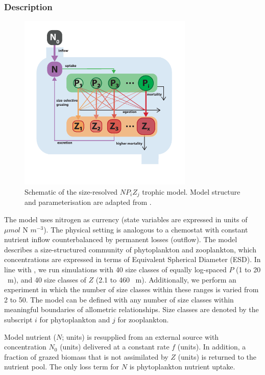 \documentclass[journal abbreviation, manuscript]{copernicus}
\begin{document}
\subsubsection{Description}
\begin{figure}[t]
\includegraphics[width=8.3cm]{Figures/firstdraft_schematics/03_schematics_ASTroCAT.pdf}
\caption{Schematic of the size-resolved $NP_{i}Z_{j}$ trophic model. Model structure and parameterisation are adapted from \citet{Banas2011b}. }
\label{Figure:ModelSchematics_3}
\end{figure}

The model uses nitrogen as currency (state variables are expressed in units of $\mu mol$ N $m^{-3}$). The physical setting is analogous to a chemostat with constant nutrient inflow counterbalanced by permanent losses (outflow). The model describes a size-structured community of phytoplankton and zooplankton, which concentrations are expressed in terms of Equivalent Spherical Diameter (ESD). In line with \citet{Banas2011b}, we run simulations with 40 size classes of equally log-spaced $P$ (1 to 20 \unit{\mu m}), and 40 size classes of $Z$ (2.1 to 460  \unit{\mu m}). Additionally, we perform an experiment in which the number of size classes within these ranges is varied from 2 to 50. The model can be defined with any number of size classes within meaningful boundaries of allometric relationships. Size classes are denoted by the subscript $i$ for phytoplankton and $j$ for zooplankton.

Model nutrient ($N$; units) is resupplied from an external source with concentration $N_0$ (units) delivered at a constant rate $f$ (units). In addition, a fraction of grazed biomass that is not assimilated by $Z$ (units) is returned to the nutrient pool. The only loss term for $N$ is phytoplankton nutrient uptake.
\end{document}
